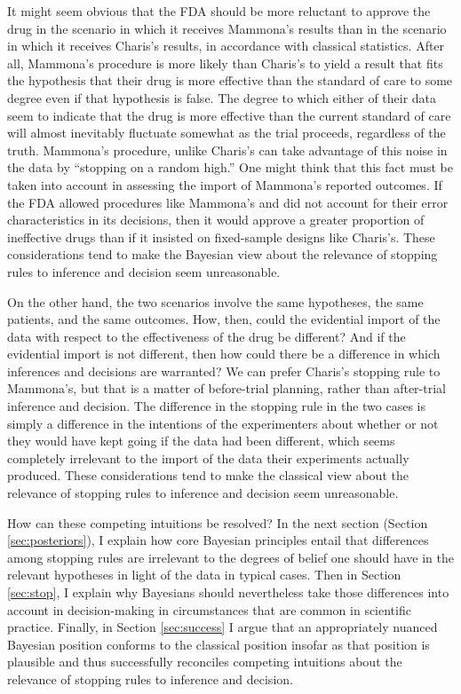 \documentclass{article}
\theoremstyle{definition}
\begin{document}
It might seem obvious that the FDA should be more reluctant to approve the drug in the scenario in which it receives Mammona's results than in the scenario in which it receives Charis's results, in accordance with classical statistics.
After all, Mammona's procedure is more likely than Charis's to yield a result that fits the hypothesis that their drug is more effective than the standard of care to some degree even if that hypothesis is false.
The degree to which either of their data seem to indicate that the drug is more effective than the current standard of care will almost inevitably fluctuate somewhat as the trial proceeds, regardless of the truth.
Mammona's procedure, unlike Charis's can take advantage of this noise in the data by ``stopping on a random high.''
One might think that this fact must be taken into account in assessing the import of Mammona's reported outcomes.
If the FDA allowed procedures like Mammona's and did not account for their error characteristics in its decisions, then it would approve a greater proportion of ineffective drugs than if it insisted on fixed-sample designs like Charis's.
These considerations tend to make the Bayesian view about the relevance of stopping rules to inference and decision seem unreasonable.

On the other hand, the two scenarios involve the same hypotheses, the same patients, and the same outcomes.
How, then, could the evidential import of the data with respect to the effectiveness of the drug be different?
And if the evidential import is not different, then how could there be a difference in which inferences and decisions are warranted?
We can prefer Charis's stopping rule to Mammona's, but that is a matter of before-trial planning, rather than after-trial inference and decision.
The difference in the stopping rule in the two cases is simply a difference in the intentions of the experimenters about whether or not they would have kept going if the data had been different, which seems completely irrelevant to the import of the data their experiments actually produced.
These considerations tend to make the classical view about the relevance of stopping rules to inference and decision seem unreasonable.

How can these competing intuitions be resolved?
In the next section (Section \ref{sec:posteriors}), I explain how core Bayesian principles entail that differences among stopping rules are irrelevant to the degrees of belief one should have in the relevant hypotheses in light of the data in typical cases.
Then in Section \ref{sec:stop}, I explain why Bayesians should nevertheless take those differences into account in decision-making in circumstances that are common in scientific practice.
Finally, in Section \ref{sec:success} I argue that an appropriately nuanced Bayesian position conforms to the classical position insofar as that position is plausible and thus successfully reconciles competing intuitions about the relevance of stopping rules to inference and decision.
\end{document}
